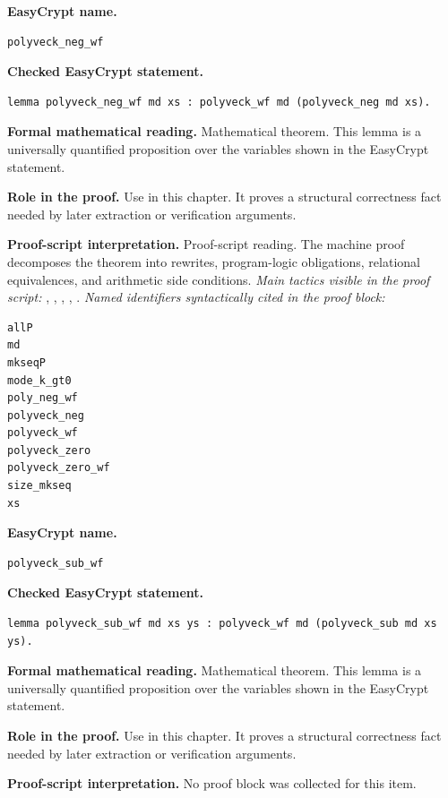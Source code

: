 \begin{formaltheorem}
\noindent\textbf{EasyCrypt name.}
\begin{lstlisting}[language=EasyCrypt,basicstyle=\ttfamily\scriptsize]
polyveck_neg_wf
\end{lstlisting}
\noindent\textbf{Checked EasyCrypt statement.}
\begin{lstlisting}[language=EasyCrypt,basicstyle=\ttfamily\scriptsize]
lemma polyveck_neg_wf md xs : polyveck_wf md (polyveck_neg md xs).
\end{lstlisting}
\noindent\textbf{Formal mathematical reading.}
Mathematical theorem. This lemma is a universally quantified proposition over the variables shown in the EasyCrypt statement.

\noindent\textbf{Role in the proof.}
Use in this chapter. It proves a structural correctness fact needed by later extraction or verification arguments.

\noindent\textbf{Proof-script interpretation.}
Proof-script reading. The machine proof decomposes the theorem into rewrites, program-logic obligations, relational equivalences, and arithmetic side conditions.
\emph{Main tactics visible in the proof script:} , , , , .
\emph{Named identifiers syntactically cited in the proof block:}
\begin{lstlisting}[language=EasyCrypt,basicstyle=\ttfamily\scriptsize]
allP
md
mkseqP
mode_k_gt0
poly_neg_wf
polyveck_neg
polyveck_wf
polyveck_zero
polyveck_zero_wf
size_mkseq
xs
\end{lstlisting}

\end{formaltheorem}

\begin{formaltheorem}
\noindent\textbf{EasyCrypt name.}
\begin{lstlisting}[language=EasyCrypt,basicstyle=\ttfamily\scriptsize]
polyveck_sub_wf
\end{lstlisting}
\noindent\textbf{Checked EasyCrypt statement.}
\begin{lstlisting}[language=EasyCrypt,basicstyle=\ttfamily\scriptsize]
lemma polyveck_sub_wf md xs ys : polyveck_wf md (polyveck_sub md xs ys).
\end{lstlisting}
\noindent\textbf{Formal mathematical reading.}
Mathematical theorem. This lemma is a universally quantified proposition over the variables shown in the EasyCrypt statement.

\noindent\textbf{Role in the proof.}
Use in this chapter. It proves a structural correctness fact needed by later extraction or verification arguments.

\noindent\textbf{Proof-script interpretation.}
No proof block was collected for this item.

\end{formaltheorem}

